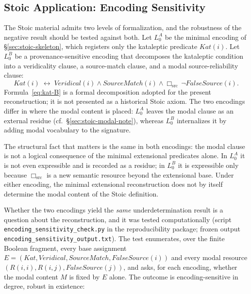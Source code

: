 \documentclass[11pt]{article}
\theoremstyle{plain}
\theoremstyle{definition}
\theoremstyle{remark}
\begin{document}


\subsection{Stoic Application: Encoding Sensitivity}
\label{sec:encoding-sensitivity}

The Stoic material admits two levels of formalization, and the
robustness of the negative result should be tested against both. Let
$L_0^A$ be the minimal encoding of \S\ref{sec:stoic-skeleton}, which
registers only the kataleptic predicate $Kat(i)$. Let $L_0^B$ be a
provenance-sensitive encoding that decomposes the kataleptic condition
into a veridicality clause, a source-match clause, and a modal
source-reliability clause:
\begin{equation}
Kat(i) \;\longleftrightarrow\; Veridical(i) \wedge SourceMatch(i)
\wedge \Box_{\mathrm{src}}\,\neg FalseSource(i).
\label{eq:kat-B}
\end{equation}
Formula~\eqref{eq:kat-B} is a formal decomposition adopted for the
present reconstruction; it is not presented as a historical Stoic
axiom. The two encodings differ in where the modal content is placed:
$L_0^A$ leaves the modal clause as an external residue (cf.\
\S\ref{sec:stoic-modal-note}), whereas $L_0^B$ internalizes it by
adding modal vocabulary to the signature.

The structural fact that matters is the same in both encodings: the
modal clause is not a logical consequence of the minimal extensional
predicates alone. In $L_0^A$ it is not even expressible and is recorded
as a residue; in $L_0^B$ it is expressible only because
$\Box_{\mathrm{src}}$ is a new semantic resource beyond the
extensional base. Under either encoding, the minimal extensional
reconstruction does not by itself determine the modal content of the
Stoic definition.

Whether the two encodings yield the \emph{same} underdetermination
result is a question about the reconstruction, and it was tested
computationally (script \texttt{encoding\_sensitivity\_check.py} in
the reproducibility package; frozen output
\texttt{encoding\_sensitivity\_output.txt}). The test enumerates,
over the finite Boolean fragment, every base assignment
$E=(Kat,Veridical,SourceMatch,FalseSource(i))$ and every modal
resource $(R(i,i),R(i,j),FalseSource(j))$, and asks, for each
encoding, whether the modal content $M$ is fixed by $E$ alone. The
outcome is encoding-sensitive in degree, robust in existence:
\end{document}
